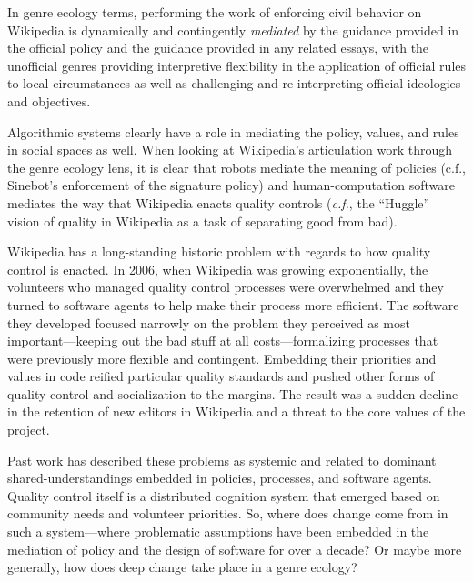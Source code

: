 In genre ecology terms, performing the work of enforcing civil behavior on Wikipedia is dynamically and contingently \emph{mediated} by the guidance provided in the official policy and the guidance provided in any related essays, with the unofficial genres providing interpretive flexibility in the application of official rules to local circumstances as well as challenging and re-interpreting official ideologies and objectives.

Algorithmic systems clearly have a role in mediating the policy, values, and rules in social spaces as well\cite{lessig1999code}.  When looking at Wikipedia's articulation work through the genre ecology lens, it is clear that robots mediate the meaning of policies (c.f., Sinebot's enforcement of the signature policy\cite{geiger2011lives}) and human-computation software mediates the way that Wikipedia enacts quality controls (\emph{c.f.}, the ``Huggle'' vision of quality in Wikipedia as a task of separating good from bad\cite{halfaker2014snuggle}).

  Wikipedia has a long-standing historic problem with regards to how quality control is enacted.  In 2006, when Wikipedia was growing exponentially, the volunteers who managed quality control processes were overwhelmed and they turned to software agents to help make their process more efficient\cite{halfaker2014snuggle}.  The software they developed focused narrowly on the problem they perceived as most important---keeping out the bad stuff at all costs---formalizing processes that were previously more flexible and contingent. Embedding their priorities and values in code reified particular quality standards and pushed other forms of quality control and socialization to the margins\cite{halfaker2013rise}.  The result was a sudden decline in the retention of new editors in Wikipedia and a threat to the core values of the project.

Past work has described these problems as systemic and related to dominant shared-understandings embedded in policies, processes, and software agents\cite{halfaker2014snuggle}.  Quality control itself is a distributed cognition system that emerged based on community needs and volunteer priorities\cite{geiger2010work}.  So, where does change come from in such a system---where problematic assumptions have been embedded in the mediation of policy and the design of software for over a decade?  Or maybe more generally, how does deep change take place in a genre ecology?

